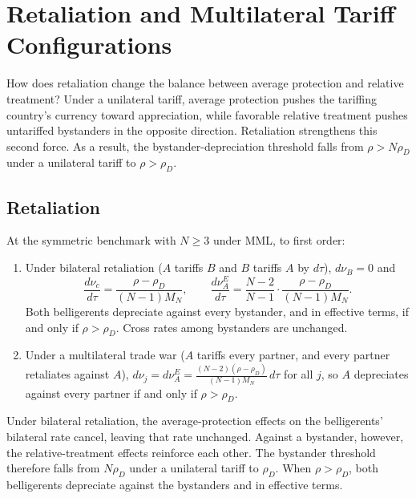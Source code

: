 \section{Retaliation and Multilateral Tariff Configurations}
\label{sec:tradewars}

How does retaliation change the balance between average protection and relative treatment? Under a unilateral tariff, average protection pushes the tariffing country's currency toward appreciation, while favorable relative treatment pushes untariffed bystanders in the opposite direction. Retaliation strengthens this second force. As a result, the bystander-depreciation threshold falls from $\rho>N\rho_D$ under a unilateral tariff to $\rho>\rho_D$.

\subsection{Retaliation}

\begin{proposition}
\label{prop:retaliation}
At the symmetric benchmark with $N\geq3$ under MML, to first order:
\begin{enumerate}[label=(\roman*)]
\item Under bilateral retaliation ($A$ tariffs $B$ and $B$ tariffs $A$ by $d\tau$), $d\nu_B=0$ and
\begin{equation}
\frac{d\nu_c}{d\tau}=\frac{\rho-\rho_D}{(N-1)M_N},\qquad
\frac{d\nu^E_A}{d\tau}=\frac{N-2}{N-1}\cdot\frac{\rho-\rho_D}{(N-1)M_N}.
\end{equation}
Both belligerents depreciate against every bystander, and in effective terms, if and only if $\rho>\rho_D$. Cross rates among bystanders are unchanged.
\item Under a multilateral trade war ($A$ tariffs every partner, and every partner retaliates against $A$), $d\nu_j=d\nu^E_A=\frac{(N-2)(\rho-\rho_D)}{(N-1)M_N}\,d\tau$ for all $j$, so $A$ depreciates against every partner if and only if $\rho>\rho_D$.
\end{enumerate}
\end{proposition}

Under bilateral retaliation, the average-protection effects on the belligerents' bilateral rate cancel, leaving that rate unchanged. Against a bystander, however, the relative-treatment effects reinforce each other. The bystander threshold therefore falls from $N\rho_D$ under a unilateral tariff to $\rho_D$. When $\rho>\rho_D$, both belligerents depreciate against the bystanders and in effective terms.

